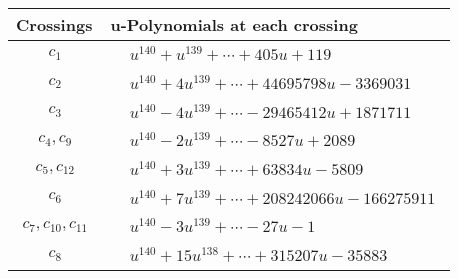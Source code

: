 \documentclass[1p]{elsarticle_modified}
\theoremstyle{definition}
\begin{document}
\begin{tabular}{m{50pt}|m{274pt}}
Crossings & \hspace{64pt}u-Polynomials at each crossing \\
\hline $$\begin{aligned}c_{1}\end{aligned}$$&$\begin{aligned}
&u^{140}+u^{139}+\cdots+405 u+119
\end{aligned}$\\
\hline $$\begin{aligned}c_{2}\end{aligned}$$&$\begin{aligned}
&u^{140}+4 u^{139}+\cdots+44695798 u-3369031
\end{aligned}$\\
\hline $$\begin{aligned}c_{3}\end{aligned}$$&$\begin{aligned}
&u^{140}-4 u^{139}+\cdots-29465412 u+1871711
\end{aligned}$\\
\hline $$\begin{aligned}c_{4},c_{9}\end{aligned}$$&$\begin{aligned}
&u^{140}-2 u^{139}+\cdots-8527 u+2089
\end{aligned}$\\
\hline $$\begin{aligned}c_{5},c_{12}\end{aligned}$$&$\begin{aligned}
&u^{140}+3 u^{139}+\cdots+63834 u-5809
\end{aligned}$\\
\hline $$\begin{aligned}c_{6}\end{aligned}$$&$\begin{aligned}
&u^{140}+7 u^{139}+\cdots+208242066 u-166275911
\end{aligned}$\\
\hline $$\begin{aligned}c_{7},c_{10},c_{11}\end{aligned}$$&$\begin{aligned}
&u^{140}-3 u^{139}+\cdots-27 u-1
\end{aligned}$\\
\hline $$\begin{aligned}c_{8}\end{aligned}$$&$\begin{aligned}
&u^{140}+15 u^{138}+\cdots+315207 u-35883
\end{aligned}$\\
\hline
\end{tabular}\\~\\
\end{document}
